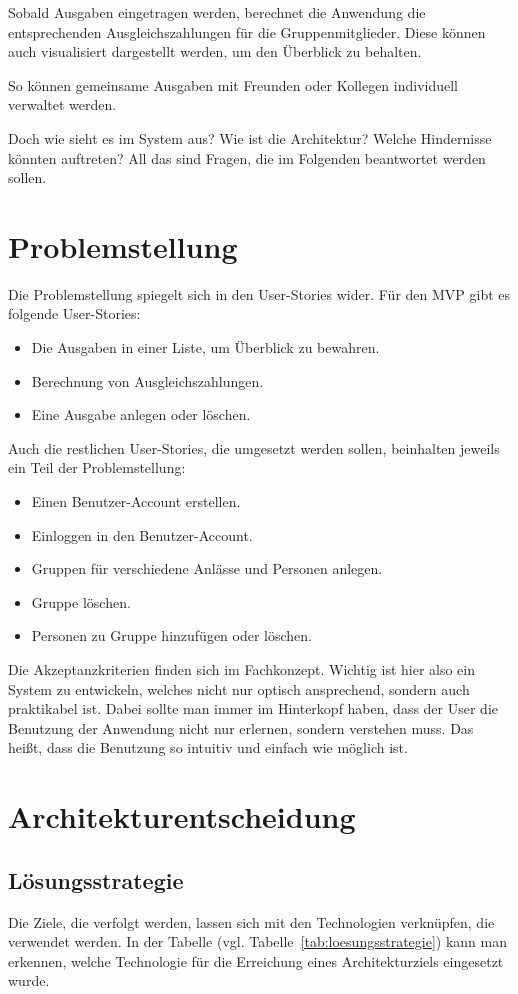\documentclass[conference]{IEEEtran}
\begin{document}
Sobald Ausgaben eingetragen werden,
berechnet die Anwendung die entsprechenden Ausgleichszahlungen
für die Gruppenmitglieder. Diese können auch visualisiert dargestellt
werden, um den Überblick zu behalten.

So können gemeinsame Ausgaben
mit Freunden oder Kollegen individuell verwaltet werden.

Doch wie sieht es im System aus? Wie ist die Architektur? Welche Hindernisse könnten auftreten?
All das sind Fragen, die im Folgenden beantwortet werden sollen.

\section{Problemstellung}
Die Problemstellung spiegelt sich in den \gls{User-Stories} wider. Für den \gls{MVP} gibt es folgende User-Stories:
\begin{itemize}
    \item Die Ausgaben in einer Liste, um Überblick zu bewahren.
    \item Berechnung von Ausgleichszahlungen.
    \item Eine Ausgabe anlegen oder löschen.
\end{itemize}
Auch die restlichen User-Stories, die umgesetzt werden sollen, beinhalten jeweils ein Teil der Problemstellung:
\begin{itemize}
    \item Einen Benutzer-Account erstellen.
    \item Einloggen in den Benutzer-Account.
    \item Gruppen für verschiedene Anlässe und Personen anlegen.
    \item Gruppe löschen.
    \item Personen zu Gruppe hinzufügen oder löschen.
\end{itemize}
Die Akzeptanzkriterien finden sich im Fachkonzept.
Wichtig ist hier also ein System zu entwickeln, welches nicht nur optisch ansprechend, sondern auch praktikabel ist.
Dabei sollte man immer im Hinterkopf haben, dass der User die Benutzung der Anwendung nicht nur erlernen, sondern verstehen muss.
Das heißt, dass die Benutzung so intuitiv und einfach wie möglich ist.

\section{Architekturentscheidung}
\subsection{Lösungsstrategie}
Die Ziele, die verfolgt werden, lassen sich mit den Technologien verknüpfen, die verwendet werden.
In der Tabelle (vgl. Tabelle~\ref{tab:loesungsstrategie}) kann man erkennen, welche Technologie für die Erreichung eines Architekturziels eingesetzt wurde.
\end{document}
